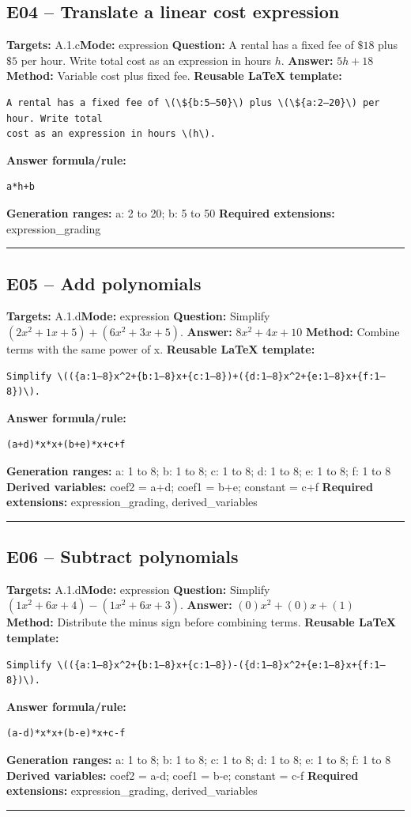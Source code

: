 \documentclass[11pt]{article}
\begin{document}
\subsection{E04 -- Translate a linear cost expression}
\textbf{Targets:} A.1.c\quad\textbf{Mode:} expression
\textbf{Question:} A rental has a fixed fee of \(\$18\) plus \(\$5\) per hour. Write total cost as an expression in hours \(h\).
\textbf{Answer:} \(5h+18\)
\textbf{Method:} Variable cost plus fixed fee.
\textbf{Reusable LaTeX template:}
\begin{verbatim}
A rental has a fixed fee of \(\${b:5–50}\) plus \(\${a:2–20}\) per hour. Write total
cost as an expression in hours \(h\).
\end{verbatim}
\textbf{Answer formula/rule:}
\begin{verbatim}
a*h+b
\end{verbatim}
\textbf{Generation ranges:} a: 2 to 20; b: 5 to 50
\textbf{Required extensions:} expression\_grading
\medskip\hrule\medskip
\subsection{E05 -- Add polynomials}
\textbf{Targets:} A.1.d\quad\textbf{Mode:} expression
\textbf{Question:} Simplify \((2x^2+1x+5)+(6x^2+3x+5)\).
\textbf{Answer:} \(8x^2+4x+10\)
\textbf{Method:} Combine terms with the same power of x.
\textbf{Reusable LaTeX template:}
\begin{verbatim}
Simplify \(({a:1–8}x^2+{b:1–8}x+{c:1–8})+({d:1–8}x^2+{e:1–8}x+{f:1–8})\).
\end{verbatim}
\textbf{Answer formula/rule:}
\begin{verbatim}
(a+d)*x*x+(b+e)*x+c+f
\end{verbatim}
\textbf{Generation ranges:} a: 1 to 8; b: 1 to 8; c: 1 to 8; d: 1 to 8; e: 1 to 8; f: 1 to 8
\textbf{Derived variables:} coef2 = a+d; coef1 = b+e; constant = c+f
\textbf{Required extensions:} expression\_grading, derived\_variables
\medskip\hrule\medskip
\subsection{E06 -- Subtract polynomials}
\textbf{Targets:} A.1.d\quad\textbf{Mode:} expression
\textbf{Question:} Simplify \((1x^2+6x+4)-(1x^2+6x+3)\).
\textbf{Answer:} \((0)x^2+(0)x+(1)\)
\textbf{Method:} Distribute the minus sign before combining terms.
\textbf{Reusable LaTeX template:}
\begin{verbatim}
Simplify \(({a:1–8}x^2+{b:1–8}x+{c:1–8})-({d:1–8}x^2+{e:1–8}x+{f:1–8})\).
\end{verbatim}
\textbf{Answer formula/rule:}
\begin{verbatim}
(a-d)*x*x+(b-e)*x+c-f
\end{verbatim}
\textbf{Generation ranges:} a: 1 to 8; b: 1 to 8; c: 1 to 8; d: 1 to 8; e: 1 to 8; f: 1 to 8
\textbf{Derived variables:} coef2 = a-d; coef1 = b-e; constant = c-f
\textbf{Required extensions:} expression\_grading, derived\_variables
\medskip\hrule\medskip
\end{document}

